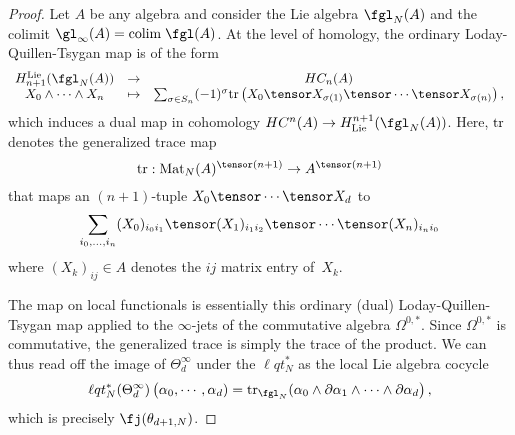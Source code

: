 
\begin{proof}
Let $A$ be any algebra and consider the Lie algebra $\fgl_N(A)$ and the colimit $\gl_\infty(A) = {\rm colim} \; \fgl (A)$. 
At the level of homology, the ordinary Loday-Quillen-Tsygan map is of the form
\[
\begin{array}{ccc}
H_{n+1}^{\rm Lie}(\fgl_N(A)) & \to & HC_{n}(A) \\
X_0 \wedge \cdots \wedge X_n & \mapsto & \sum_{\sigma \in S_n} (-1)^{\sigma} {\rm tr} \left(X_0 \tensor X_{\sigma(1)} \tensor\cdots \tensor X_{\sigma(n)} \right), 
\end{array}
\] 
which induces a dual map in cohomology $HC^n(A) \to H^{n+1}_{\rm Lie}(\fgl_N(A))$. 
Here, ${\rm tr}$ denotes the generalized trace map
\[
{\rm tr} : {\rm Mat}_N(A)^{\tensor(n+1)} \to A^{\tensor (n+1)} 
\]
that maps an $(n+1)$-tuple $X_0\tensor \cdots \tensor X_d$ to 
\[
\sum_{i_0,\ldots,i_n} (X_0)_{i_0 i_1} \tensor (X_1)_{i_1i_2} \tensor \cdots \tensor (X_n)_{i_n i_0}
\]
where $(X_k)_{ij} \in A$ denotes the $ij$ matrix entry of~$X_k$.

The map on local functionals is essentially this ordinary (dual) Loday-Quillen-Tsygan map applied to the $\infty$-jets of the commutative algebra $\Omega^{0,*}$. 
Since $\Omega^{0,*}$ is commutative, the generalized trace is simply the trace of the product.
We can thus read off the image of $\Theta^\infty_d$ under the $\ell q t_N^*$ as the local Lie algebra cocycle
\begin{align*}
\ell q t_N^*(\Theta_d^\infty)\left(\alpha_0, \cdots, \alpha_d) = {\rm tr}_{\fgl_N}(\alpha_0 \wedge \partial \alpha_1\wedge \cdots \wedge \partial \alpha_d\right),
\end{align*}
which is precisely $\fj(\theta_{d+1,N})$. 
\end{proof}


